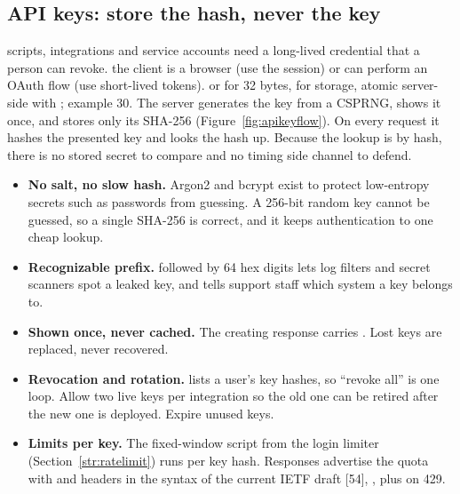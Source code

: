 \subsection*{API keys: store the hash, never the key}
{scripts, integrations and service accounts need a long-lived credential that a person can revoke.}
{the client is a browser (use the session) or can perform an OAuth flow (use short-lived tokens).}
{ or  for 32 bytes,  for storage, atomic server-side  with ; example 30.}
The server generates the key from a CSPRNG, shows it once, and stores only its SHA-256 (Figure~\ref{fig:apikeyflow}). On every request it hashes the presented key and looks the hash up. Because the lookup is by hash, there is no stored secret to compare and no timing side channel to defend.
\begin{itemize}
\item \textbf{No salt, no slow hash.} Argon2 and bcrypt exist to protect low-entropy secrets such as passwords from guessing. A 256-bit random key cannot be guessed, so a single SHA-256 is correct, and it keeps authentication to one cheap lookup.
\item \textbf{Recognizable prefix.}  followed by 64 hex digits lets log filters and secret scanners spot a leaked key, and tells support staff which system a key belongs to.
\item \textbf{Shown once, never cached.} The creating response carries . Lost keys are replaced, never recovered.
\item \textbf{Revocation and rotation.}  lists a user's key hashes, so ``revoke all'' is one loop. Allow two live keys per integration so the old one can be retired after the new one is deployed. Expire unused keys.
\item \textbf{Limits per key.} The fixed-window script from the login limiter (Section~\ref{str:ratelimit}) runs per key hash. Responses advertise the quota with  and  headers in the syntax of the current IETF draft [54], , plus  on 429.
\end{itemize}

